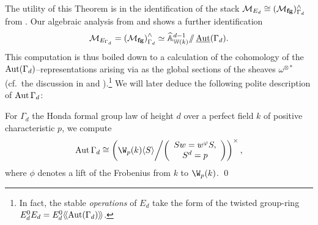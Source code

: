The utility of this Theorem is in the identification of the stack $\mathcal{M}_{E_d} \cong (\mathcal{M}_{\mathbf{fg}})^\wedge_{\Gamma_d}$ from .  Our algebraic analysis from  and  shows a further identification \[\mathcal{M}_{E_{\Gamma_d}} = \left( \mathcal{M}_{\mathbf{fg}} \right)^\wedge_{\Gamma_d} \simeq \widehat{\mathbb A}^{d-1}_{\mathbb W(k)} /\!\!/ \operatorname{\underline{\smash{\operatorname{Aut}}}}(\Gamma_d).\]  This computation is thus boiled down to a calculation of the cohomology of the $\operatorname{Aut}(\Gamma_d)$--representations arising via  as the global sections of the sheaves $\omega^{\otimes *}$ (cf.\ the discussion in  and ).\footnote{In fact, the stable \emph{operations} of $E_d$ take the form of the twisted group-ring $E_d^0 E_d = E_d^0\langle\!\langle\operatorname{Aut}(\Gamma_d)\rangle\!\rangle$.}  We will later deduce the following polite description of $\operatorname{Aut} \Gamma_d$:
\begin{theorem}
For $\Gamma_d$ the Honda formal group law of height $d$ over a perfect field $k$ of positive characteristic $p$, we compute \[\Aut \Gamma_d \cong \left( \W_p(k) \<S\> \middle/ \left( \begin{array}{c} Sw = w^\phi S, \\ S^d = p \end{array} \right) \right)^\times,\] where $\phi$ denotes a lift of the Frobenius from $k$ to $\W_p(k)$. \qed
\end{theorem}

